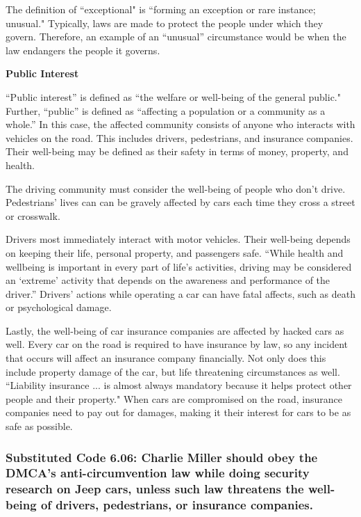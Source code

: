 \documentclass[12pt]{article}
\begin{document}
\begin{multicols}{2}
The definition of ``exceptional" is ``forming an exception or rare instance; unusual." \cite{dictionary} Typically, laws are made to protect the people under which they govern. Therefore, an example of an ``unusual'' circumstance would be when the law endangers the people it governs.

\vspace{.5cm}\hspace{-.5cm}\textbf{Public Interest}\vspace{.2cm}

``Public interest'' is defined as ``the welfare or well-being of the general public."\cite{dictionary} Further, ``public'' is defined as ``affecting a population or a community as a whole.''\cite{dictionary} In this case, the affected community consists of anyone who interacts with vehicles on the road. This includes drivers, pedestrians, and insurance companies. Their well-being may be defined as their safety in terms of money, property, and health.

The driving community must consider the well-being of people who don't drive. Pedestrians' lives can can be gravely affected by cars each time they cross a street or crosswalk. 

Drivers most immediately interact with motor vehicles. Their well-being depends on keeping their life, personal property, and passengers safe. ``While health and wellbeing is important in every part of life’s activities, driving may be considered an ‘extreme’ activity that depends on the awareness and performance of the driver.''\cite{driverWellBeing} Drivers' actions while operating a car can have fatal affects, such as death or psychological damage.

Lastly, the well-being of car insurance companies are affected by hacked cars as well. Every car on the road is required to have insurance by law,\cite{insurance} so any incident that occurs will affect an insurance company financially. Not only does this include property damage of the car, but life threatening circumstances as well. ``Liability insurance ... is almost always mandatory because it helps protect other people and their property."\cite{insurance} When cars are compromised on the road, insurance companies need to pay out for damages, making it their interest for cars to be as safe as possible.

\subsubsection{Substituted Code 6.06: Charlie Miller should obey the DMCA's anti-circumvention law while doing security research on Jeep cars, unless such law threatens the well-being of drivers, pedestrians, or insurance companies.}


\end{multicols}
\end{document}
